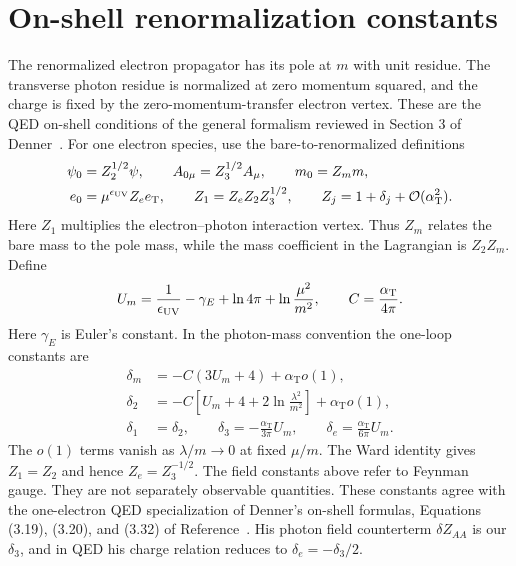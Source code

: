 \section{On-shell renormalization constants}
The renormalized electron propagator has its pole at $m$ with unit
residue. The transverse photon residue is normalized at zero momentum
squared, and the charge is fixed by the zero-momentum-transfer electron
vertex. These are the QED on-shell conditions of the general formalism
reviewed in Section 3 of Denner~\cite{compton-overview-denner-renormalization}.
For one electron species, use the bare-to-renormalized definitions
\begin{align}
 \psi_0&=Z_2^{1/2}\psi,\qquad A_{0\mu}=Z_3^{1/2}A_\mu,\qquad
 m_0=Z_m m,\\
 e_0&=\mu^{\epsilon_{\rm UV}}Z_e e_{\mathrm T},\qquad
 Z_1=Z_eZ_2Z_3^{1/2},\qquad Z_j=1+\delta_j+\mathcal{O}(\alpha_{\mathrm T}^2).
\end{align}
Here $Z_1$ multiplies the electron--photon interaction vertex.
Thus $Z_m$ relates the bare mass to the pole mass, while the mass coefficient in the
Lagrangian is $Z_2Z_m$. Define
\begin{equation}
 U_m=\frac1{\epsilon_{\rm UV}}-\gamma_E+\ln4\pi
                   +\ln\frac{\mu^2}{m^2},\qquad
 C=\frac{\alpha_{\mathrm T}}{4\pi}.
\end{equation}
Here $\gamma_E$ is Euler's constant. In the photon-mass convention the
one-loop constants are
\begin{align}
 \delta_m&=-C(3U_m+4)+\alpha_{\mathrm T}o(1),\\
 \delta_2&=-C\left[U_m+4+2\ln\frac{\lambda^2}{m^2}\right]
                           +\alpha_{\mathrm T}o(1),\\
 \delta_1&=\delta_2,\qquad
 \delta_3=-\frac{\alpha_{\mathrm T}}{3\pi}U_m,\qquad
 \delta_e=\frac{\alpha_{\mathrm T}}{6\pi}U_m.
 \label{eq:comp-overview-z}
\end{align}
The $o(1)$ terms vanish as $\lambda/m\to0$ at fixed $\mu/m$.
The Ward identity gives $Z_1=Z_2$ and hence $Z_e=Z_3^{-1/2}$.
The field constants above refer to Feynman gauge. They are not
separately observable quantities.
These constants agree with the one-electron QED specialization of
Denner's on-shell formulas, Equations (3.19), (3.20), and (3.32) of
Reference~\cite{compton-overview-denner-renormalization}.
His photon field counterterm $\delta Z_{AA}$ is our $\delta_3$,
and in QED his charge relation reduces to $\delta_e=-\delta_3/2$.


